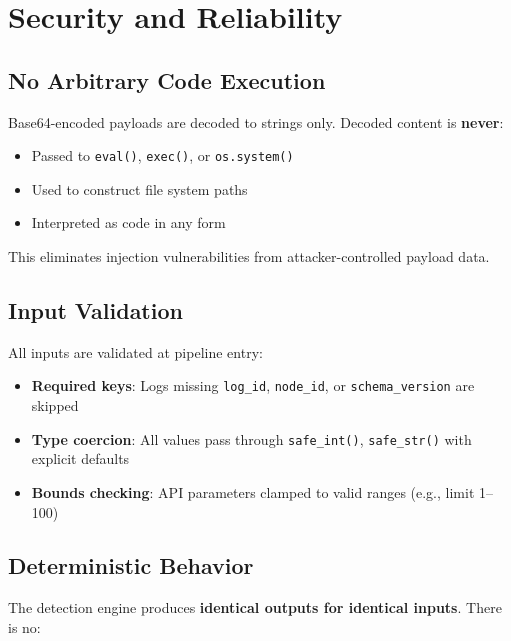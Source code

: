 \documentclass[12pt,a4paper]{article}
\begin{document}
\section{Security and Reliability}

\subsection{No Arbitrary Code Execution}

Base64-encoded payloads are decoded to strings only. Decoded content is \textbf{never}:

\begin{itemize}[noitemsep]
    \item Passed to \texttt{eval()}, \texttt{exec()}, or \texttt{os.system()}
    \item Used to construct file system paths
    \item Interpreted as code in any form
\end{itemize}

This eliminates injection vulnerabilities from attacker-controlled payload data.

\subsection{Input Validation}

All inputs are validated at pipeline entry:

\begin{itemize}[noitemsep]
    \item \textbf{Required keys}: Logs missing \texttt{log\_id}, \texttt{node\_id}, or \texttt{schema\_version} are skipped
    \item \textbf{Type coercion}: All values pass through \texttt{safe\_int()}, \texttt{safe\_str()} with explicit defaults
    \item \textbf{Bounds checking}: API parameters clamped to valid ranges (e.g., limit 1--100)
\end{itemize}

\subsection{Deterministic Behavior}

The detection engine produces \textbf{identical outputs for identical inputs}. There is no:
\end{document}
